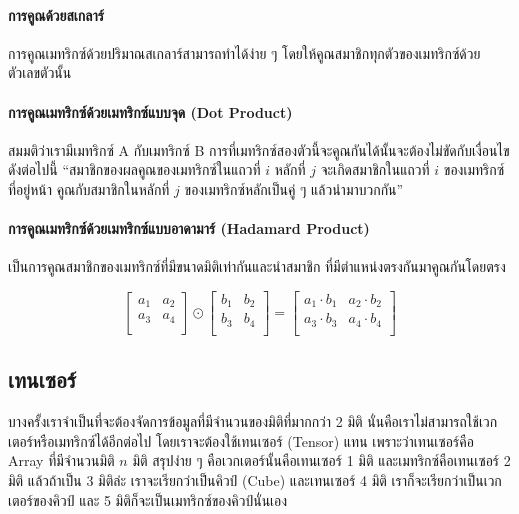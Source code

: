 \paragraph{การคูณด้วยสเกลาร์} การคูณเมทริกซ์ด้วยปริมาณสเกลาร์สามารถทำได้ง่าย ๆ โดยให้คูณสมาชิกทุกตัวของเมทริกซ์ด้วยตัวเลขตัวนั้น

\paragraph{การคูณเมทริกซ์ด้วยเมทริกซ์แบบจุด (Dot Product)}
สมมติว่าเรามีเมทริกซ์ A กับเมทริกซ์ B การที่เมทริกซ์สองตัวนี้จะคูณกันได้นั้นจะต้องไม่ขัดกับเงื่อนไขดังต่อไปนี้
\enquote{สมาชิกของผลคูณของเมทริกซ์ในแถวที่ $i$ หลักที่ $j$ จะเกิดสมาชิกในแถวที่ $i$ ของเมทริกซ์ที่อยู่หน้า คูณกับสมาชิกในหลักที่ $j$ 
ของเมทริกซ์หลักเป็นคู่ ๆ แล้วนำมาบวกกัน}

\paragraph{การคูณเมทริกซ์ด้วยเมทริกซ์แบบอาดามาร์ (Hadamard Product)} เป็นการคูณสมาชิกของเมทริกซ์ที่มีขนาดมิติเท่ากันและนำสมาชิก%
ที่มีตำแหน่งตรงกันมาคูณกันโดยตรง

\begin{equation}
    \begin{bmatrix}
    a_1 & a_2 \\
    a_3 & a_4 \\
    \end{bmatrix}
    \odot
    \begin{bmatrix}
    b_1 & b_2 \\
    b_3 & b_4 \\
    \end{bmatrix}
    =
    \begin{bmatrix}
    a_1 \cdot b_1 & a_2 \cdot b_2 \\
    a_3 \cdot b_3 & a_4 \cdot b_4 \\
\end{bmatrix}
\end{equation}

\subsection{เทนเซอร์}

บางครั้งเราจำเป็นที่จะต้องจัดการข้อมูลที่มีจำนวนของมิติที่มากกว่า 2 มิติ นั่นคือเราไม่สามารถใช้เวกเตอร์หรือเมทริกซ์ได้อีกต่อไป
โดยเราจะต้องใช้เทนเซอร์ (Tensor) แทน เพราะว่าเทนเซอร์คือ Array ที่มีจำนวนมิติ $n$ มิติ สรุปง่าย ๆ คือเวกเตอร์นั้นคือเทนเซอร์ 1 มิติ 
และเมทริกซ์คือเทนเซอร์ 2 มิติ แล้วถ้าเป็น 3 มิติล่ะ เราจะเรียกว่าเป็นคิวป์ (Cube) และเทนเซอร์ 4 มิติ เราก็จะเรียกว่าเป็นเวกเตอร์ของคิวป์ 
และ 5 มิติก็จะเป็นเมทริกซ์ของคิวป์นั่นเอง
